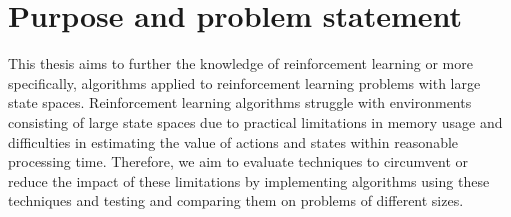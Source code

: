 \section{Purpose and problem statement}

This thesis aims to further the knowledge of reinforcement learning or more specifically, algorithms applied to reinforcement learning problems with large state spaces. Reinforcement learning algorithms struggle with environments consisting of large state spaces due to practical limitations in memory usage and difficulties in estimating the value of actions and states within reasonable processing time. Therefore, we aim to evaluate techniques to circumvent or reduce the impact of these limitations by implementing algorithms using these techniques and testing and comparing them on problems of different sizes.

